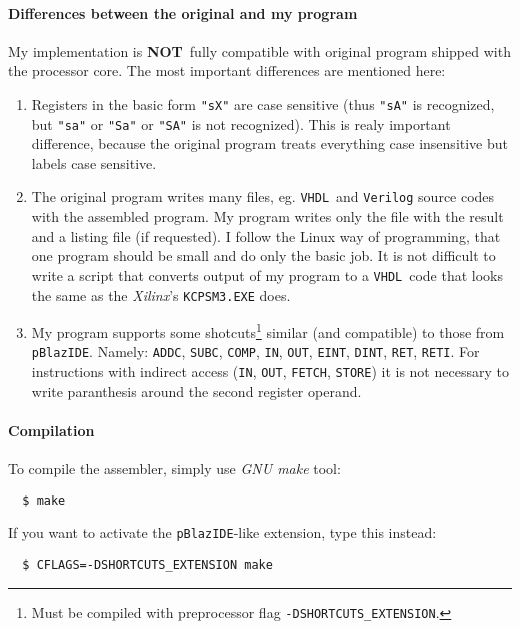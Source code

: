\documentclass[10pt,a4paper]{article}
\def\Xilinx{\textit{Xilinx}}
\def\VHDL{\texttt{VHDL}}
\def\NOT{\textbf{NOT}}
\def\ins #1{\texttt{#1}}
\begin{document}
\paragraph{Differences between the original and my program}
My implementation is \NOT\ fully compatible with original program 
	shipped with the processor core. The most important differences are mentioned here:
\begin{enumerate}
	\item Registers in the basic form \texttt{"sX"} are case sensitive (thus \texttt{"sA"} is recognized, but \texttt{"sa"} 
		or \texttt{"Sa"} or \texttt{"SA"} is not recognized). This is realy important difference, because the original
		program treats everything case insensitive but labels case sensitive. 
	\item The original program writes many files, eg. \VHDL\ and \texttt{Verilog} source codes with
		the assembled program. My program writes only the file with the result and a listing file (if requested).
		I follow the Linux way of programming, that one program should be small and do only the basic job.
		It is not difficult to write a script that converts output of my program to a \VHDL\ code that looks 
		the same as the \Xilinx's \texttt{KCPSM3.EXE} does.
	\item My program supports some shotcuts\footnote{Must be compiled with preprocessor flag \texttt{-DSHORTCUTS\_EXTENSION}.} 
		similar (and compatible) to those from \texttt{pBlazIDE}. Namely: \ins{ADDC}, \ins{SUBC}, \ins{COMP}, \ins{IN}, \ins{OUT}, 
	   \ins{EINT}, \ins{DINT}, \ins{RET}, \ins{RETI}. For instructions with indirect access (\ins{IN}, \ins{OUT}, \ins{FETCH}, 
		\ins{STORE}) it is not necessary	to write paranthesis around the second register operand.
\end{enumerate}

\paragraph{Compilation}
To compile the assembler, simply use \textit{GNU make} tool:
\begin{verbatim}
  $ make
\end{verbatim}

If you want to activate the \texttt{pBlazIDE}-like extension, type this instead:
\begin{verbatim}
  $ CFLAGS=-DSHORTCUTS_EXTENSION make
\end{verbatim}
\end{document}
